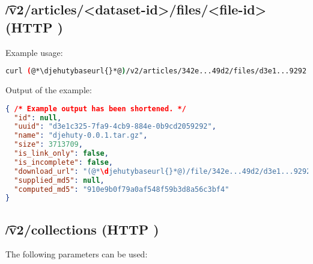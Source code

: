\subsection{\t{/v2/articles/<dataset-id>/files/<file-id>} (HTTP )}

  Example usage:
\begin{lstlisting}[language=bash]
curl (@*\djehutybaseurl{}*@)/v2/articles/342e...49d2/files/d3e1...9292 | jq
\end{lstlisting}

  Output of the example:
\begin{lstlisting}[language=JSON]
{ /* Example output has been shortened. */
  "id": null,
  "uuid": "d3e1c325-7fa9-4cb9-884e-0b9cd2059292",
  "name": "djehuty-0.0.1.tar.gz",
  "size": 3713709,
  "is_link_only": false,
  "is_incomplete": false,
  "download_url": "(@*\djehutybaseurl{}*@)/file/342e...49d2/d3e1...9292",
  "supplied_md5": null,
  "computed_md5": "910e9b0f79a0af548f59b3d8a56c3bf4"
}
\end{lstlisting}

\subsection{\t{/v2/collections} (HTTP )}
\label{sec:v2-collections}

  The following parameters can be used:

